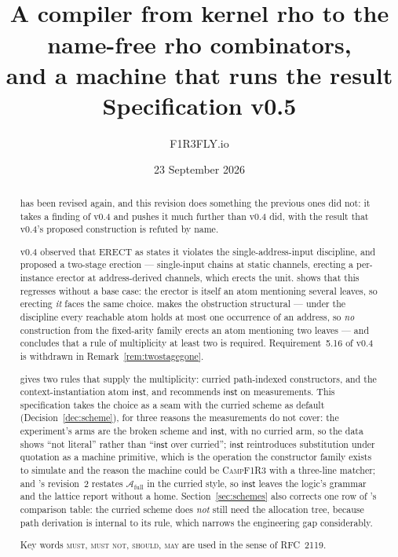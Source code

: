 \documentclass[11pt,a4paper]{article}
\title{\textbf{\Comb}\\[1mm]
\large A compiler from kernel rho to the name-free rho combinators,\\
and a machine that runs the result\\[2mm]
\normalsize Specification v0.5}
\author{F1R3FLY.io}
\date{23 September 2026}
\newcommand{\Camp}{\textsc{CampF1R3}}
\newcommand{\MUST}{\textsc{must}}
\newcommand{\MUSTNOT}{\textsc{must not}}
\newcommand{\SHOULD}{\textsc{should}}
\newcommand{\MAY}{\textsc{may}}
\newcommand{\Atm}{\mathcal{A}}
\newcommand{\ERECT}{\mathrm{ERECT}}
\newcommand{\inst}{\mathsf{inst}}
\theoremstyle{definition}
\theoremstyle{plain}
\begin{document}
\maketitle

\begin{abstract}
\noindent
\cite{draft3} has been revised again, and this revision does something the
previous ones did not: it takes a finding of v0.4 and pushes it much further
than v0.4 did, with the result that v0.4's proposed construction is refuted by
name.

v0.4 observed that $\ERECT$ as \cite[Def.~6.8]{draft3} states it violates the
single-address-input discipline, and proposed a two-stage erection ---
single-input chains at static channels, erecting a per-instance erector at
address-derived channels, which erects the unit. \cite[\S6.6]{draft3} shows
that this regresses without a base case: the erector is itself an atom
mentioning several leaves, so erecting \emph{it} faces the same choice.
\cite[Prop.~6.17]{draft3} makes the obstruction structural --- under the
discipline every reachable atom holds at most one occurrence of an address, so
\emph{no} construction from the fixed-arity family erects an atom mentioning
two leaves --- and \cite[Lem.~6.19]{draft3} concludes that a rule of
multiplicity at least two is required. Requirement~5.16 of v0.4 is withdrawn
in Remark~\ref{rem:twostagegone}.

\cite[\S6.7]{draft3} gives two rules that supply the multiplicity: curried
path-indexed constructors, and the context-instantiation atom $\inst$, and
recommends $\inst$ on measurements. This specification takes the choice as a
seam with the curried scheme as default (Decision~\ref{dec:scheme}), for three
reasons the measurements do not cover: the experiment's arms are the broken
scheme and $\inst$, with no curried arm, so the data shows ``not literal''
rather than ``$\inst$ over curried''; $\inst$ reintroduces substitution
under quotation as a machine primitive, which is the operation the
constructor family exists to simulate and the reason the machine could be
\Camp{} with a three-line matcher; and \cite{logic}'s revision~2 restates
$\Atm_{\mathrm{full}}$ in the curried style, so $\inst$ leaves the logic's
grammar and the lattice report without a home. Section~\ref{sec:schemes} also
corrects one row of \cite[\S6.7]{draft3}'s comparison table: the curried
scheme does \emph{not} still need the allocation tree, because path
derivation is internal to its rule, which narrows the engineering gap
considerably.

Key words \MUST, \MUSTNOT, \SHOULD, \MAY{} are used in the sense of RFC~2119.
\end{abstract}
\end{document}
